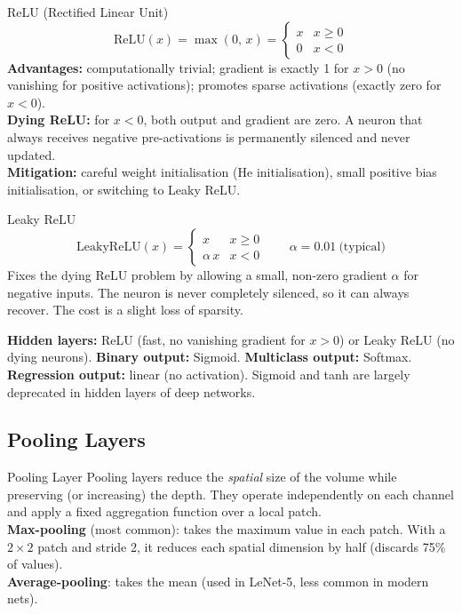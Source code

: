 \documentclass[11pt,a4paper]{article}
\begin{document}
\begin{defbox}{ReLU (Rectified Linear Unit)}
\[
\mathrm{ReLU}(x) = \max(0,\, x) = \begin{cases} x & x \geq 0 \\ 0 & x < 0 \end{cases}
\]
\textbf{Advantages:} computationally trivial; gradient is exactly 1 for $x > 0$ (no vanishing for positive activations); promotes sparse activations (exactly zero for $x < 0$).\\
\textbf{Dying ReLU:} for $x < 0$, both output and gradient are zero. A neuron that always receives negative pre-activations is permanently silenced and never updated.\\
\textbf{Mitigation:} careful weight initialisation (He initialisation), small positive bias initialisation, or switching to Leaky ReLU.
\end{defbox}

\begin{defbox}{Leaky ReLU}
\[
\mathrm{LeakyReLU}(x) = \begin{cases} x & x \geq 0 \\ \alpha\,x & x < 0 \end{cases} \qquad \alpha = 0.01\ \text{(typical)}
\]
Fixes the dying ReLU problem by allowing a small, non-zero gradient $\alpha$ for negative inputs. The neuron is never completely silenced, so it can always recover. The cost is a slight loss of sparsity.
\end{defbox}

\begin{warnbox}
\textbf{Hidden layers:} ReLU (fast, no vanishing gradient for $x > 0$) or Leaky ReLU (no dying neurons). \textbf{Binary output:} Sigmoid. \textbf{Multiclass output:} Softmax. \textbf{Regression output:} linear (no activation). Sigmoid and tanh are largely deprecated in hidden layers of deep networks.
\end{warnbox}

\subsection{Pooling Layers}

\begin{defbox}{Pooling Layer}
Pooling layers reduce the \emph{spatial} size of the volume while preserving (or increasing) the depth. They operate independently on each channel and apply a fixed aggregation function over a local patch.\\
\textbf{Max-pooling} (most common): takes the maximum value in each patch. With a $2\times2$ patch and stride 2, it reduces each spatial dimension by half (discards 75\% of values).\\
\textbf{Average-pooling}: takes the mean (used in LeNet-5, less common in modern nets).
\end{defbox}
\end{document}
